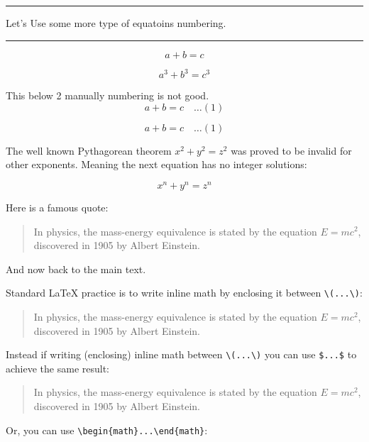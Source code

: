 \documentclass[12pt, letterpaper]{article}
\begin{document}
\noindent\rule{\linewidth}{5pt}
\begin{center}
Let's Use some more type of equatoins numbering.
\end{center}
\noindent\rule{\linewidth}{5pt}


\begin{equation}
    a + b = c \tag{000}
\end{equation}


\begin{equation}
    a^3 + b^3 = c^3
    \label{eq:pythagoras3}
\end{equation}


This below 2 manually numbering is not good.
\[
a + b = c \quad \ldots (1)
\]

$$
a + b = c \quad \ldots (1)
$$



\newpage


The well known Pythagorean theorem \(x^2 + y^2 = z^2\) was 
proved to be invalid for other exponents. 
Meaning the next equation has no integer solutions:

\[ x^n + y^n = z^n \]


Here is a famous quote:

\begin{quote}
In physics, the mass-energy equivalence is stated 
by the equation \(E=mc^2\), discovered in 1905 by Albert Einstein.
\end{quote}

And now back to the main text.




\noindent Standard \LaTeX{} practice is to write inline math by enclosing it between \verb|\(...\)|:

\begin{quote}
In physics, the mass-energy equivalence is stated 
by the equation \(E=mc^2\), discovered in 1905 by Albert Einstein.
\end{quote}

\noindent Instead if writing (enclosing) inline math between \verb|\(...\)| you can use \texttt{\$...\$} to achieve the same result:

\begin{quote}
In physics, the mass-energy equivalence is stated 
by the equation $E=mc^2$, discovered in 1905 by Albert Einstein.
\end{quote}

\noindent Or, you can use \verb|\begin{math}...\end{math}|:
\end{document}
